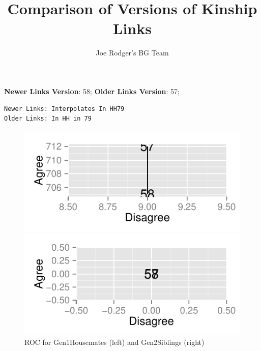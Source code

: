 \documentclass[a4paper]{article}\usepackage{graphicx, color}
\title{Comparison of Versions of Kinship Links}
\author{Joe Rodger's BG Team}
\makeatletter
\def\maxwidth{ %
  \ifdim\Gin@nat@width>\linewidth
    \linewidth
  \else
    \Gin@nat@width
  \fi
}
\newenvironment{kframe}{%
 \def\at@end@of@kframe{}%
 \ifinner\ifhmode%
  \def\at@end@of@kframe{\end{minipage}}%
  \begin{minipage}{\columnwidth}%
 \fi\fi%
 \def\FrameCommand##1{\hskip\@totalleftmargin \hskip-\fboxsep
 \colorbox{shadecolor}{##1}\hskip-\fboxsep
     \hskip-\linewidth \hskip-\@totalleftmargin \hskip\columnwidth}%
 \MakeFramed {\advance\hsize-\width
   \@totalleftmargin\z@ \linewidth\hsize
   \@setminipage}}%
 {\par\unskip\endMakeFramed%
 \at@end@of@kframe}
\newenvironment{knitrout}{}{} %
\makeatother
\begin{document}
\maketitle

\setlength{\parindent}{0pt}%







\textbf{Newer Links Version}: 58;
\textbf{Older Links Version}: 57;

\begin{knitrout}
\color{fgcolor}\begin{kframe}
\begin{verbatim}
Newer Links: Interpolates In HH79
Older Links: In HH in 79
\end{verbatim}
\end{kframe}
\end{knitrout}


\begin{figure}[htbp]
\begin{knitrout}
\color{fgcolor}
\includegraphics[width=\maxwidth]{figure/unnamed-chunk-31} 

\includegraphics[width=\maxwidth]{figure/unnamed-chunk-32} 

\end{knitrout}

\caption{ROC for Gen1Housemates (left) and Gen2Siblings (right)}
\end{figure}
\end{document}
